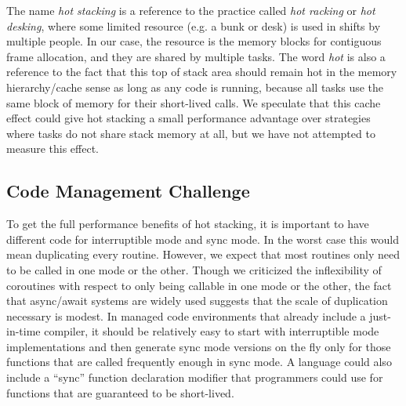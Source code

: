 \documentclass[a4paper,UKenglish,cleveref, autoref]{lipics-v2019}
\begin{document}
The name \emph{hot stacking} is a reference to the practice called \emph{hot racking} or \emph{hot desking}, where some limited resource (e.g. a bunk or desk) is used in shifts by multiple people.
In our case, the resource is the memory blocks for contiguous frame allocation, and they are shared by multiple tasks.
The word \emph{hot} is also a reference to the fact that this top of stack area should remain hot in the memory hierarchy{\slash}cache sense as long as any code is running, because all tasks use the same block of memory for their short-lived calls.
We speculate that this cache effect could give hot stacking a small performance advantage over strategies where tasks do not share stack memory at all, but we have not attempted to measure this effect.

\subsection{Code Management Challenge}

To get the full performance benefits of hot stacking, it is important to have different code for interruptible mode and sync mode.
In the worst case this would mean duplicating every routine.
However, we expect that most routines only need to be called in one mode or the other.
Though we criticized the inflexibility of coroutines with respect to only being callable in one mode or the other, the fact that async{\slash}await systems are widely used suggests that the scale of duplication necessary is modest.
In managed code environments that already include a just-in-time compiler, it should be relatively easy to start with interruptible mode implementations and then generate sync mode versions on the fly only for those functions that are called frequently enough in sync mode.
A language could also include a ``sync'' function declaration modifier that programmers could use for functions that are guaranteed to be short-lived.
\end{document}
